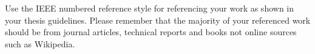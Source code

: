 Use the IEEE numbered reference style for referencing your work as shown in your thesis guidelines.
Please remember that the majority of your referenced work should be from journal articles, technical
reports and books not online sources such as Wikipedia.




